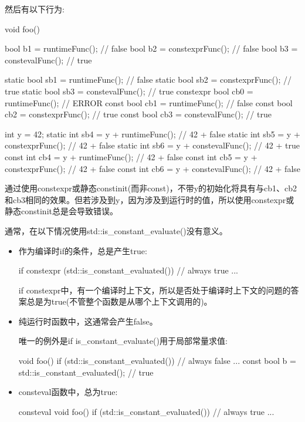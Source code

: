然后有以下行为:

\begin{cpp}
void foo()
{
	bool b1 = runtimeFunc(); // false
	bool b2 = constexprFunc(); // false
	bool b3 = constevalFunc(); // true

	static bool sb1 = runtimeFunc(); // false
	static bool sb2 = constexprFunc(); // true
	static bool sb3 = constevalFunc(); // true
	constexpr bool cb0 = runtimeFunc();    // ERROR
	const bool cb1 = runtimeFunc(); // false
	const bool cb2 = constexprFunc(); // true
	const bool cb3 = constevalFunc(); // true

	int y = 42;
	static int sb4 = y + runtimeFunc(); // 42 + false
	static int sb5 = y + constexprFunc(); // 42 + false
	static int sb6 = y + constevalFunc(); // 42 + true
	const int cb4 = y + runtimeFunc(); // 42 + false
	const int cb5 = y + constexprFunc(); // 42 + false
	const int cb6 = y + constevalFunc(); // 42 + false
}
\end{cpp}

通过使用constexpr或静态constinit(而非const)，不带y的初始化将具有与cb1、cb2和cb3相同的效果。但若涉及到y，因为涉及到运行时的值，所以使用constexpr或静态constinit总是会导致错误。

通常，在以下情况使用std::is\_constant\_evaluate()没有意义。

\begin{itemize}
\item
作为编译时if的条件，总是产生true:

\begin{cpp}
if constexpr (std::is_constant_evaluated()) { // always true
	...
}
\end{cpp}

if constexpr中，有一个编译时上下文，所以是否处于编译时上下文的问题的答案总是为true(不管整个函数是从哪个上下文调用的)。

\item
纯运行时函数中，这通常会产生false。

唯一的例外是if is\_constant\_evaluate()用于局部常量求值:

\begin{cpp}
void foo() {
	if (std::is_constant_evaluated()) { // always false
		...
	}
	const bool b = std::is_constant_evaluated(); // true
}
\end{cpp}

\item
consteval函数中，总为true:

\begin{cpp}
consteval void foo() {
	if (std::is_constant_evaluated()) { // always true
		...
	}
}
\end{cpp}

\end{itemize}


